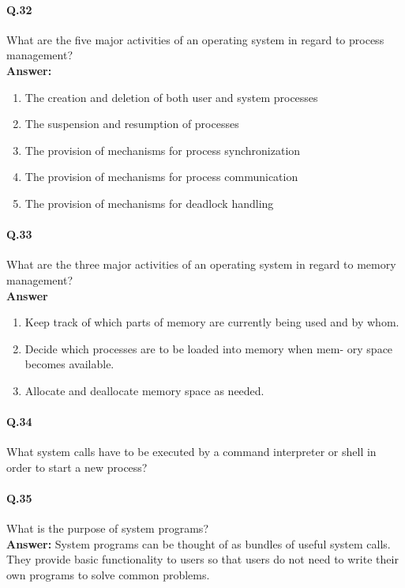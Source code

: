 \documentclass[a4paper,10pt]{article}
\begin{document}
\paragraph{Q.32}
What are the five major activities of an operating system in regard to
process management?\\
\textbf{Answer:}
\begin{enumerate}
   \item The creation and deletion of both user and system processes
\item The suspension and resumption of processes
\item The provision of mechanisms for process synchronization
\item The provision of mechanisms for process communication
\item The provision of mechanisms for deadlock handling
 
\end{enumerate}

\paragraph{Q.33}
What are the three major activities of an operating system in regard to
memory management? \\
\textbf{Answer}
\begin{enumerate}
   \item  Keep track of which parts of memory are currently being used
and by whom.
\item Decide which processes are to be loaded into memory when mem-
ory space becomes available.
\item Allocate and deallocate memory space as needed.
\end{enumerate}

\paragraph{Q.34}
What system calls have to be executed by a command interpreter or shell
in order to start a new process?

\paragraph{Q.35}
What is the purpose of system programs? \\
\textbf{Answer:} System programs can be thought of as bundles of useful
system calls. They provide basic functionality to users so that users do
not need to write their own programs to solve common problems.
\end{document}
